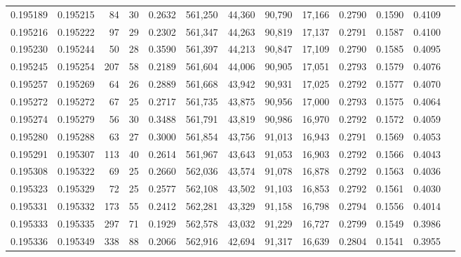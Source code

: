 \begin{tabular}{rrrrrrrrrrrrr}
0.195189 & 0.195215 &    84 &  30 &                                     0.2632 & 561,250 &  44,360 &  90,790 &  17,166 & 0.2790 & 0.1590 & 0.4109 \\
0.195216 & 0.195222 &    97 &  29 &                                     0.2302 & 561,347 &  44,263 &  90,819 &  17,137 & 0.2791 & 0.1587 & 0.4100 \\
0.195230 & 0.195244 &    50 &  28 &                                     0.3590 & 561,397 &  44,213 &  90,847 &  17,109 & 0.2790 & 0.1585 & 0.4095 \\
0.195245 & 0.195254 &   207 &  58 &                                     0.2189 & 561,604 &  44,006 &  90,905 &  17,051 & 0.2793 & 0.1579 & 0.4076 \\
0.195257 & 0.195269 &    64 &  26 &                                     0.2889 & 561,668 &  43,942 &  90,931 &  17,025 & 0.2792 & 0.1577 & 0.4070 \\
0.195272 & 0.195272 &    67 &  25 &                                     0.2717 & 561,735 &  43,875 &  90,956 &  17,000 & 0.2793 & 0.1575 & 0.4064 \\
0.195274 & 0.195279 &    56 &  30 &                                     0.3488 & 561,791 &  43,819 &  90,986 &  16,970 & 0.2792 & 0.1572 & 0.4059 \\
0.195280 & 0.195288 &    63 &  27 &                                     0.3000 & 561,854 &  43,756 &  91,013 &  16,943 & 0.2791 & 0.1569 & 0.4053 \\
0.195291 & 0.195307 &   113 &  40 &                                     0.2614 & 561,967 &  43,643 &  91,053 &  16,903 & 0.2792 & 0.1566 & 0.4043 \\
0.195308 & 0.195322 &    69 &  25 &                                     0.2660 & 562,036 &  43,574 &  91,078 &  16,878 & 0.2792 & 0.1563 & 0.4036 \\
0.195323 & 0.195329 &    72 &  25 &                                     0.2577 & 562,108 &  43,502 &  91,103 &  16,853 & 0.2792 & 0.1561 & 0.4030 \\
0.195331 & 0.195332 &   173 &  55 &                                     0.2412 & 562,281 &  43,329 &  91,158 &  16,798 & 0.2794 & 0.1556 & 0.4014 \\
0.195333 & 0.195335 &   297 &  71 &                                     0.1929 & 562,578 &  43,032 &  91,229 &  16,727 & 0.2799 & 0.1549 & 0.3986 \\
0.195336 & 0.195349 &   338 &  88 &                                     0.2066 & 562,916 &  42,694 &  91,317 &  16,639 & 0.2804 & 0.1541 & 0.3955 \\

\end{tabular}
